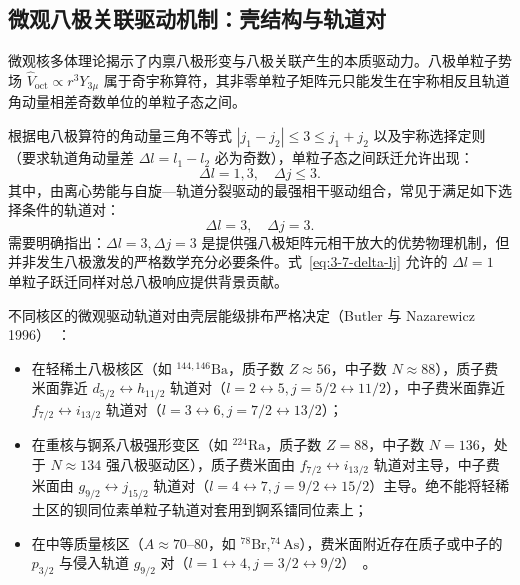 \subsection{微观八极关联驱动机制：壳结构与轨道对}\label{sec:3-7-4}

微观核多体理论揭示了内禀八极形变与八极关联产生的本质驱动力。八极单粒子势场 $\hat{V}_{\text{oct}} \propto r^3 Y_{3\mu}$ 属于奇宇称算符，其非零单粒子矩阵元只能发生在宇称相反且轨道角动量相差奇数单位的单粒子态之间。

根据电八极算符的角动量三角不等式 $|j_1 - j_2| \le 3 \le j_1 + j_2$ 以及宇称选择定则（要求轨道角动量差 $\Delta l = l_1 - l_2$ 必为奇数），单粒子态之间跃迁允许出现：
\begin{equation}\label{eq:3-7-delta-lj}
\Delta l = 1, 3, \quad \Delta j \le 3.
\end{equation}
其中，由离心势能与自旋—轨道分裂驱动的最强相干驱动组合，常见于满足如下选择条件的轨道对：
\begin{equation}\label{eq:3-7-favored-octupole}
\Delta l = 3, \quad \Delta j = 3.
\end{equation}
需要明确指出：$\Delta l = 3, \Delta j = 3$ 是提供强八极矩阵元相干放大的优势物理机制，但并非发生八极激发的严格数学充分必要条件。式~\eqref{eq:3-7-delta-lj} 允许的 $\Delta l = 1$ 单粒子跃迁同样对总八极响应提供背景贡献。

不同核区的微观驱动轨道对由壳层能级排布严格决定（Butler 与 Nazarewicz 1996）~\cite{butler-nazarewicz-1996-intrinsic-reflection-asymmetry}：
\begin{itemize}
\item 在轻稀土八极核区（如 $^{144, 146}\mathrm{Ba}$，质子数 $Z \approx 56$，中子数 $N \approx 88$），质子费米面靠近 $d_{5/2} \leftrightarrow h_{11/2}$ 轨道对（$l = 2 \leftrightarrow 5, j = 5/2 \leftrightarrow 11/2$），中子费米面靠近 $f_{7/2} \leftrightarrow i_{13/2}$ 轨道对（$l = 3 \leftrightarrow 6, j = 7/2 \leftrightarrow 13/2$）；
\item 在重核与锕系八极强形变区（如 $^{224}\mathrm{Ra}$，质子数 $Z = 88$，中子数 $N = 136$，处于 $N \approx 134$ 强八极驱动区），质子费米面由 $f_{7/2} \leftrightarrow i_{13/2}$ 轨道对主导，中子费米面由 $g_{9/2} \leftrightarrow j_{15/2}$ 轨道对（$l = 4 \leftrightarrow 7, j = 9/2 \leftrightarrow 15/2$）主导。绝不能将轻稀土区的钡同位素单粒子轨道对套用到锕系镭同位素上；
\item 在中等质量核区（$A \approx 70$--$80$，如 $^{78}\mathrm{Br}, ^{74}\mathrm{As}$），费米面附近存在质子或中子的 $p_{3/2}$ 与侵入轨道 $g_{9/2}$ 对（$l = 1 \leftrightarrow 4, j = 3/2 \leftrightarrow 9/2$）~\cite{liu-chen-2016-78br-chirality-reflection-symmetry-thesis,xiao-xiao-2019-high-spin-74as-thesis}。
\end{itemize}

